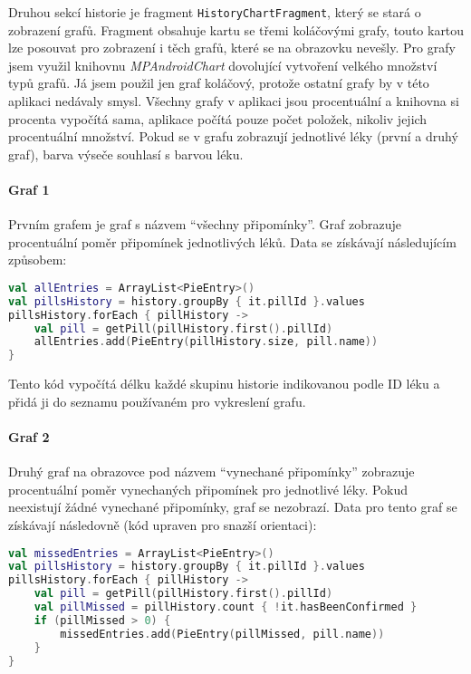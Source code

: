 \documentclass[../TakeYourPill.tex]{subfiles}
\begin{document}
Druhou sekcí historie je fragment \texttt{HistoryChartFragment}, který se stará o zobrazení grafů. Fragment obsahuje kartu se třemi koláčovými grafy, touto kartou lze posouvat pro zobrazení i těch grafů, které se na obrazovku nevešly. Pro grafy jsem využil knihovnu \textit{MPAndroidChart} \cite{chart} dovolující vytvoření velkého množství typů grafů. Já jsem použil jen graf koláčový, protože ostatní grafy by v této aplikaci nedávaly smysl. Všechny grafy v aplikaci jsou procentuální a knihovna si procenta vypočítá sama, aplikace počítá pouze počet položek, nikoliv jejich procentuální množství. Pokud se v grafu zobrazují jednotlivé léky (první a druhý graf), barva výseče souhlasí s barvou léku. 

\paragraph{Graf 1} Prvním grafem je graf s názvem \enquote{všechny připomínky}. Graf zobrazuje procentuální poměr připomínek jednotlivých léků. Data se získávají následujícím způsobem:

\setmonofont{JetBrains Mono}
\begin{lstlisting}[language=Kotlin]
val allEntries = ArrayList<PieEntry>()
val pillsHistory = history.groupBy { it.pillId }.values
pillsHistory.forEach { pillHistory ->
    val pill = getPill(pillHistory.first().pillId)
    allEntries.add(PieEntry(pillHistory.size, pill.name))
}
\end{lstlisting}
\setmonofont{Latin Modern Mono}

Tento kód vypočítá délku každé skupinu historie indikovanou podle ID léku a přidá ji do seznamu používaném pro vykreslení grafu.


\paragraph{Graf 2} Druhý graf na obrazovce pod názvem \enquote{vynechané připomínky} zobrazuje procentuální poměr vynechaných připomínek pro jednotlivé léky. Pokud neexistují žádné vynechané připomínky, graf se nezobrazí. Data pro tento graf se získávají následovně (kód upraven pro snazší orientaci):

\setmonofont{JetBrains Mono}
\begin{lstlisting}[language=Kotlin]
val missedEntries = ArrayList<PieEntry>()
val pillsHistory = history.groupBy { it.pillId }.values
pillsHistory.forEach { pillHistory ->
    val pill = getPill(pillHistory.first().pillId)
    val pillMissed = pillHistory.count { !it.hasBeenConfirmed }
    if (pillMissed > 0) {
        missedEntries.add(PieEntry(pillMissed, pill.name))
    }
}
\end{lstlisting}
\setmonofont{Latin Modern Mono}
\end{document}
